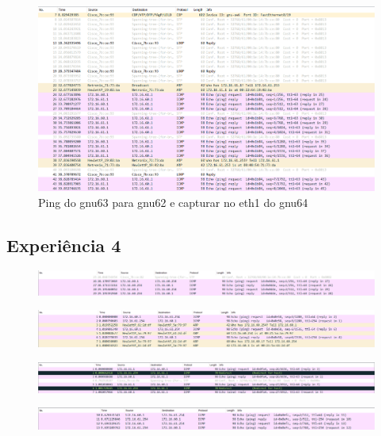 \documentclass[article, a4paper, 11pt, oneside]{memoir}
\begin{document}
\begin{figure}[h]
	\centering
\includegraphics[scale=0.55]{exp3-step10-ping-gnu62-from-gnu63-eth1.png}
\caption{Ping do gnu63 para gnu62 e capturar no eth1 do gnu64}
\end{figure}

\newpage
\subsection{Experiência 4}
\begin{figure}[h]
	\centering
\includegraphics[scale=0.40]{exp4-step3-ping-gnu64-from-gnu63.png}
\caption{}
\end{figure}

\begin{figure}[h]
	\centering
\includegraphics[scale=0.55]{exp4-step3-ping-ROUTER-from-gnu63.png}
\caption{}
\end{figure}

\begin{figure}[h]
	\centering
\includegraphics[scale=0.55]{exp4-step4-ping-gnu63-from-gnu62.png}
\caption{}
\end{figure}

\begin{figure}[h]
	\centering
\includegraphics[scale=0.55]{exp4-step7.png}
\caption{}
\end{figure}
\end{document}
